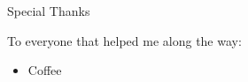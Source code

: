 \documentclass[../main.tex]{subfiles}
\begin{document}
    {\Huge Special Thanks}
    
    To everyone that helped me along the way:
    \begin{itemize}
        \item Coffee
    \end{itemize}
\end{document}
